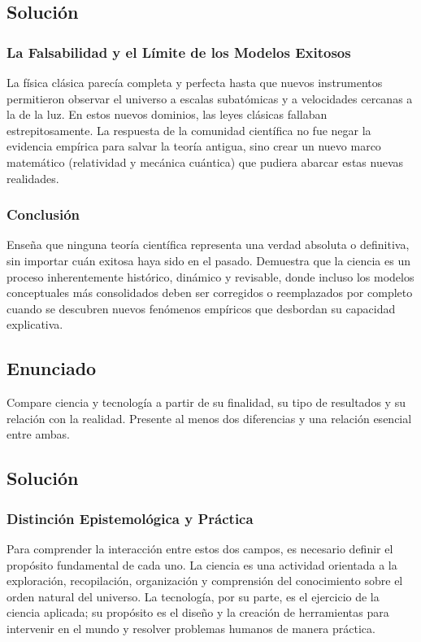 \documentclass[12pt, a4paper]{article}
\begin{document}
\subsection*{Solución}

\subsubsection*{La Falsabilidad y el Límite de los Modelos Exitosos}
La física clásica parecía completa y perfecta hasta que nuevos instrumentos permitieron observar el universo a escalas subatómicas y a velocidades cercanas a la de la luz. En estos nuevos dominios, las leyes clásicas fallaban estrepitosamente. La respuesta de la comunidad científica no fue negar la evidencia empírica para salvar la teoría antigua, sino crear un nuevo marco matemático (relatividad y mecánica cuántica) que pudiera abarcar estas nuevas realidades. 

\subsubsection*{Conclusión}
Enseña que ninguna teoría científica representa una verdad absoluta o definitiva, sin importar cuán exitosa haya sido en el pasado. Demuestra que la ciencia es un proceso inherentemente histórico, dinámico y revisable, donde incluso los modelos conceptuales más consolidados deben ser corregidos o reemplazados por completo cuando se descubren nuevos fenómenos empíricos que desbordan su capacidad explicativa.

\newpage

\subsection*{Enunciado}
Compare ciencia y tecnología a partir de su finalidad, su tipo de resultados y su relación con la realidad. Presente al menos dos diferencias y una relación esencial entre ambas.

\subsection*{Solución}

\subsubsection*{Distinción Epistemológica y Práctica}
Para comprender la interacción entre estos dos campos, es necesario definir el propósito fundamental de cada uno. La ciencia es una actividad orientada a la exploración, recopilación, organización y comprensión del conocimiento sobre el orden natural del universo. La tecnología, por su parte, es el ejercicio de la ciencia aplicada; su propósito es el diseño y la creación de herramientas para intervenir en el mundo y resolver problemas humanos de manera práctica.
\end{document}
